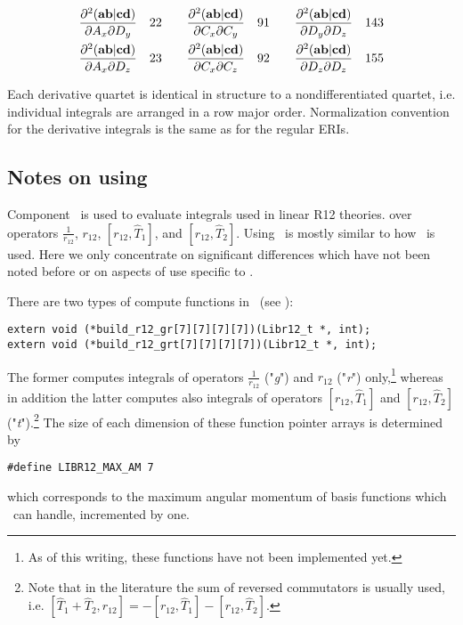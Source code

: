 \documentclass[12pt]{article}
\begin{document}
\begin{scriptsize}
\begin{eqnarray}
\frac{\partial^2 ({\bf ab}|{\bf cd})}{\partial A_x \partial D_y} \quad 22 \quad \quad \frac{\partial^2 ({\bf ab}|{\bf cd})}{\partial C_x \partial C_y} \quad 91 \quad \quad 
\frac{\partial^2 ({\bf ab}|{\bf cd})}{\partial D_y \partial D_z} \quad 143 \nonumber \\
\frac{\partial^2 ({\bf ab}|{\bf cd})}{\partial A_x \partial D_z} \quad 23 \quad \quad \frac{\partial^2 ({\bf ab}|{\bf cd})}{\partial C_x \partial C_z} \quad 92 \quad \quad 
\frac{\partial^2 ({\bf ab}|{\bf cd})}{\partial D_z \partial D_z} \quad 155 \nonumber
\end{eqnarray}
\end{scriptsize}

Each derivative quartet is identical in structure to a nondifferentiated
quartet, i.e. individual integrals are arranged in a row major order. Normalization convention
for the derivative integrals is the same as for the regular ERIs.

\subsection{Notes on using \librij}
Component \librij\ is used to evaluate integrals used in linear R12 theories\cite{Kutzelnigg85,Kutzelnigg91,Klopper92,Valeev00:r12ints}.
over operators $\frac{1}{r_{12}}$, $r_{12}$, $[r_{12},\hat{T}_1]$, and $[r_{12},\hat{T}_2]$. 
Using \librij\ is mostly similar to how \libint\ is used. Here we only concentrate on significant
differences which have not been noted before or on aspects of use specific to \librij .

There are two types of compute functions in \librij\ (see \librijh):
\begin{verbatim}
extern void (*build_r12_gr[7][7][7][7])(Libr12_t *, int);
extern void (*build_r12_grt[7][7][7][7])(Libr12_t *, int);
\end{verbatim}
The former computes integrals of operators $\frac{1}{r_{12}}$ ("{\em g}") and $r_{12}$ ("{\em r}") only,\footnote{As of this writing,
these functions have not been implemented yet.}
whereas in addition the latter computes also integrals of operators $[r_{12},\hat{T}_1]$ and $[r_{12},\hat{T}_2]$ ("{\em t}").\footnote{Note
that in the literature the sum of reversed commutators is usually used, i.e. $[\hat{T}_1 + \hat{T}_2,r_{12}] = - [r_{12},\hat{T}_1] - [r_{12},\hat{T}_2]$.}
The size of each dimension of these function pointer arrays is determined by
\begin{verbatim}
#define LIBR12_MAX_AM 7
\end{verbatim}
which corresponds to the maximum angular momentum of basis functions which \librij\ can handle, incremented by one.
\end{document}
